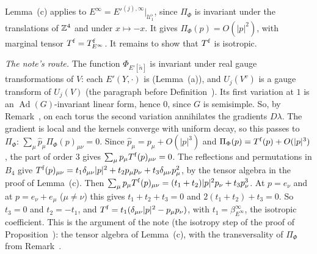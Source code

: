 \begin{step}
Lemma~(c) applies to $E^\infty=E'^{(j),\infty}|_{\mathcal U^\flat_1}$, since $\Pi_\Phi$ is invariant under the translations of $\mathbb Z^4$ and under $x\mapsto-x$. It gives $\Pi_\Phi(p)=O(|p|^2)$, with marginal tensor $T^{\rm f}=T^{\rm f}_{E^\infty}$. It remains to show that $T^{\rm f}$ is isotropic.

\emph{The note's route.} The function $\Phi_{E'[\tilde n]}$ is invariant under real gauge transformations of $V$: each $E'(Y,\cdot)$ is (Lemma~(a)), and $U_j(V^v)$ is a gauge transform of $U_j(V)$ (the paragraph before Definition~). Its first variation at $1$ is an $\operatorname{Ad}(G)$-invariant linear form, hence $0$, since $G$ is semisimple. So, by Remark~, on each torus the second variation annihilates the gradients $D\lambda$. The gradient is local and the kernels converge with uniform decay, so this passes to $\Pi_\Phi$: $\sum_\mu\hat p_\mu\Pi_\Phi(p)_{\mu\nu}=0$. Since $\hat p_\mu=p_\mu+O(|p|^3)$ and $\Pi_\Phi(p)=T^{\rm f}(p)+O(|p|^3)$, the part of order $3$ gives $\sum_\mu p_\mu T^{\rm f}(p)_{\mu\nu}=0$. The reflections and permutations in $B_4$ give $T^{\rm f}(p)_{\mu\nu}=t_1\delta_{\mu\nu}|p|^2+t_2p_\mu p_\nu+t_3\delta_{\mu\nu}p_\mu^2$, by the tensor algebra in the proof of Lemma~(c). Then $\sum_\mu p_\mu T^{\rm f}(p)_{\mu\nu}=(t_1+t_2)|p|^2p_\nu+t_3p_\nu^3$. At $p=e_\nu$ and at $p=e_\nu+e_\mu$ ($\mu\ne\nu$) this gives $t_1+t_2+t_3=0$ and $2(t_1+t_2)+t_3=0$. So $t_3=0$ and $t_2=-t_1$, and $T^{\rm f}=t_1(\delta_{\mu\nu}|p|^2-p_\mu p_\nu)$, with $t_1=\beta^\infty_{E^\infty}$, the isotropic coefficient. This is the argument of the note (the isotropy step of the proof of Proposition~): the tensor algebra of Lemma~(c), with the transversality of $\Pi_\Phi$ from Remark~.


\end{step}
